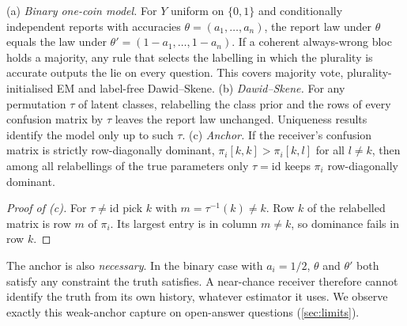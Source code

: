 \begin{proposition}\label{prop:switching}
(a) \emph{Binary one-coin model.} For $Y$ uniform on $\{0,1\}$ and conditionally independent reports with accuracies $\theta=(a_1,\dots,a_n)$, the report law under $\theta$ equals the law under $\theta'=(1-a_1,\dots,1-a_n)$. If a coherent always-wrong bloc holds a majority, any rule that selects the labelling in which the plurality is accurate outputs the lie on every question. This covers majority vote, plurality-initialised EM and label-free Dawid--Skene.
(b) \emph{Dawid--Skene.} For any permutation $\tau$ of latent classes, relabelling the class prior and the rows of every confusion matrix by $\tau$ leaves the report law unchanged. Uniqueness results~\citep{kruskal1977,allman2009} identify the model only up to such $\tau$.
(c) \emph{Anchor.} If the receiver's confusion matrix is strictly row-diagonally dominant, $\pi_i[k,k]>\pi_i[k,l]$ for all $l\neq k$, then among all relabellings of the true parameters only $\tau=\mathrm{id}$ keeps $\pi_i$ row-diagonally dominant.
\end{proposition}
\begin{proof}[Proof of (c)]
For $\tau\neq\mathrm{id}$ pick $k$ with $m=\tau^{-1}(k)\neq k$. Row $k$ of the relabelled matrix is row $m$ of $\pi_i$. Its largest entry is in column $m\neq k$, so dominance fails in row $k$.
\end{proof}
The anchor is also \emph{necessary}. In the binary case with $a_i=1/2$, $\theta$ and $\theta'$ both satisfy any constraint the truth satisfies. A near-chance receiver therefore cannot identify the truth from its own history, whatever estimator it uses. We observe exactly this weak-anchor capture on open-answer questions (\cref{sec:limits}).

